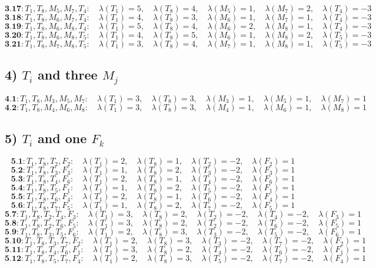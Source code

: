 \documentclass[12p]{article}
\numberwithin{equation}{section}
\begin{document}
\[
\textbf{3.17}: T_1, T_8, M_5, M_7, T_4:\quad \lambda(T_1) = 5,\quad \lambda(T_8) = 4,\quad \lambda(M_5) = 1,\quad \lambda(M_7) = 2,\quad \lambda(T_4) = -3
\]
\[
\textbf{3.18}: T_1, T_8, M_6, M_7, T_4:\quad \lambda(T_1) = 4,\quad \lambda(T_8) = 3,\quad \lambda(M_6) = 1,\quad \lambda(M_7) = 1,\quad \lambda(T_4) = -3
\]
\[
\textbf{3.19}: T_1, T_8, M_6, M_8, T_4:\quad \lambda(T_1) = 5,\quad \lambda(T_8) = 4,\quad \lambda(M_6) = 2,\quad \lambda(M_8) = 1,\quad \lambda(T_4) = -3
\]
\[
\textbf{3.20}: T_1, T_8, M_6, M_8, T_5:\quad \lambda(T_1) = 4,\quad \lambda(T_8) = 5,\quad \lambda(M_6) = 1,\quad \lambda(M_8) = 2,\quad \lambda(T_5) = -3
\]
\[
\textbf{3.21}: T_1, T_8, M_7, M_8, T_5:\quad \lambda(T_1) = 3,\quad \lambda(T_8) = 4,\quad \lambda(M_7) = 1,\quad \lambda(M_8) = 1,\quad \lambda(T_5) = -3
\]
\subsection*{4) $T_i$ and three $M_j$}
\[
\textbf{4.1}: T_1, T_8, M_3, M_5, M_7:\quad \lambda(T_1) = 3,\quad \lambda(T_8) = 3,\quad \lambda(M_3) = 1,\quad \lambda(M_5) = 1,\quad \lambda(M_7) = 1
\]
\[
\textbf{4.2}: T_1, T_8, M_4, M_6, M_8:\quad \lambda(T_1) = 3,\quad \lambda(T_8) = 3,\quad \lambda(M_4) = 1,\quad \lambda(M_6) = 1,\quad \lambda(M_8) = 1
\]
\subsection*{5) $T_i$ and one $F_k$}
\[
\textbf{5.1}: T_1, T_8, T_2, F_2:\quad \lambda(T_1) = 2,\quad \lambda(T_8) = 1,\quad \lambda(T_2) = -2,\quad \lambda(F_2) = 1
\]
\[
\textbf{5.2}: T_1, T_8, T_3, F_3:\quad \lambda(T_1) = 1,\quad \lambda(T_8) = 2,\quad \lambda(T_3) = -2,\quad \lambda(F_3) = 1
\]
\[
\textbf{5.3}: T_1, T_8, T_4, F_6:\quad \lambda(T_1) = 2,\quad \lambda(T_8) = 1,\quad \lambda(T_4) = -2,\quad \lambda(F_6) = 1
\]
\[
\textbf{5.4}: T_1, T_8, T_5, F_1:\quad \lambda(T_1) = 1,\quad \lambda(T_8) = 2,\quad \lambda(T_5) = -2,\quad \lambda(F_1) = 1
\]
\[
\textbf{5.5}: T_1, T_8, T_6, F_4:\quad \lambda(T_1) = 2,\quad \lambda(T_8) = 1,\quad \lambda(T_6) = -2,\quad \lambda(F_4) = 1
\]
\[
\textbf{5.6}: T_1, T_8, T_7, F_5:\quad \lambda(T_1) = 1,\quad \lambda(T_8) = 2,\quad \lambda(T_7) = -2,\quad \lambda(F_5) = 1
\]
\[
\textbf{5.7}: T_1, T_8, T_2, T_4, F_3:\quad \lambda(T_1) = 3,\quad \lambda(T_8) = 2,\quad \lambda(T_2) = -2,\quad \lambda(T_4) = -2,\quad \lambda(F_3) = 1
\]
\[
\textbf{5.8}: T_1, T_8, T_2, T_6, F_5:\quad \lambda(T_1) = 3,\quad \lambda(T_8) = 2,\quad \lambda(T_2) = -2,\quad \lambda(T_6) = -2,\quad \lambda(F_5) = 1
\]
\[
\textbf{5.9}: T_1, T_8, T_3, T_5, F_6:\quad \lambda(T_1) = 2,\quad \lambda(T_8) = 3,\quad \lambda(T_3) = -2,\quad \lambda(T_5) = -2,\quad \lambda(F_6) = 1
\]
\[
\textbf{5.10}: T_1, T_8, T_3, T_7, F_2:\quad \lambda(T_1) = 2,\quad \lambda(T_8) = 3,\quad \lambda(T_3) = -2,\quad \lambda(T_7) = -2,\quad \lambda(F_2) = 1
\]
\[
\textbf{5.11}: T_1, T_8, T_4, T_6, F_1:\quad \lambda(T_1) = 3,\quad \lambda(T_8) = 2,\quad \lambda(T_4) = -2,\quad \lambda(T_6) = -2,\quad \lambda(F_1) = 1
\]
\[
\textbf{5.12}: T_1, T_8, T_5, T_7, F_4:\quad \lambda(T_1) = 2,\quad \lambda(T_8) = 3,\quad \lambda(T_5) = -2,\quad \lambda(T_7) = -2,\quad \lambda(F_4) = 1
\]
\end{document}
